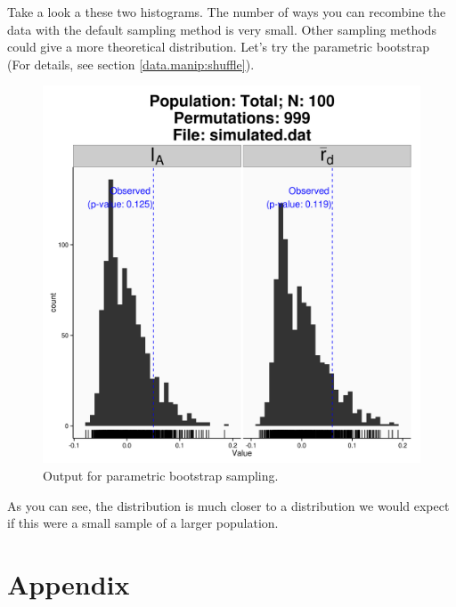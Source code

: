 \documentclass[letterpaper]{article}
\begin{document}
Take a look a these two histograms. The number of ways you can recombine the data with the default sampling method is very small. Other sampling methods could give a more theoretical distribution. Let's try the parametric bootstrap (For details, see section \ref{data.manip:shuffle}).
\begin{figure}[h!]
  \centering
  \caption{\footnotesize Output for parametric bootstrap sampling.}
  \label{simulated_param_fig}
  \includegraphics{simulated_param_fig.png}
\end{figure}

As you can see, the distribution is much closer to a distribution we would expect if this were a small sample of a larger population. 


\section{Appendix}\label{appendix}
\end{document}
